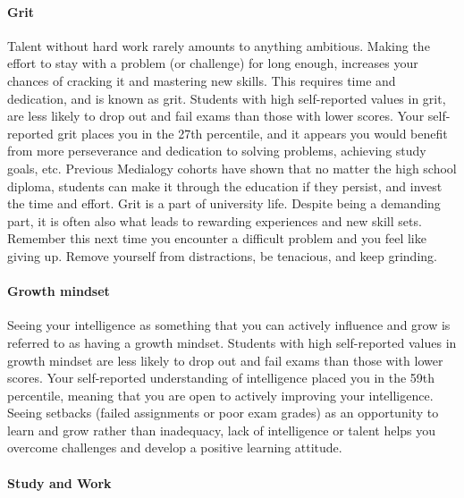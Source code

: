 \documentclass[]{article}
\let\oldparagraph\paragraph
\renewcommand{\paragraph}[1]{\oldparagraph{#1}\mbox{}}
\begin{document}
\paragraph{Grit}\label{grit}

Talent without hard work rarely amounts to anything ambitious. Making
the effort to stay with a problem (or challenge) for long enough,
increases your chances of cracking it and mastering new skills. This
requires time and dedication, and is known as grit. Students with high
self-reported values in grit, are less likely to drop out and fail exams
than those with lower scores. Your self-reported grit places you in the
27th percentile, and it appears you would benefit from more perseverance
and dedication to solving problems, achieving study goals, etc. Previous
Medialogy cohorts have shown that no matter the high school diploma,
students can make it through the education if they persist, and invest
the time and effort. Grit is a part of university life. Despite being a
demanding part, it is often also what leads to rewarding experiences and
new skill sets. Remember this next time you encounter a difficult
problem and you feel like giving up. Remove yourself from distractions,
be tenacious, and keep grinding.

\paragraph{Growth mindset}\label{growth-mindset}

Seeing your intelligence as something that you can actively influence
and grow is referred to as having a growth mindset. Students with high
self-reported values in growth mindset are less likely to drop out and
fail exams than those with lower scores. Your self-reported
understanding of intelligence placed you in the 59th percentile, meaning
that you are open to actively improving your intelligence. Seeing
setbacks (failed assignments or poor exam grades) as an opportunity to
learn and grow rather than inadequacy, lack of intelligence or talent
helps you overcome challenges and develop a positive learning attitude.

\paragraph{Study and Work}\label{study-and-work}
\end{document}
